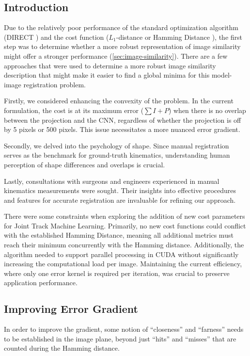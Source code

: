\subsection{Introduction}
Due to the relatively poor performance of the standard optimization algorithm (DIRECT \cite{jonesLipschitzianOptimizationLipschitz1993,floodAutomatedRegistration3D2018}) and the cost function ($L_{1}$-distance or Hamming Distance \cite{floodAutomatedRegistration3D2018}), the first step was to determine whether a more robust representation of image similarity might offer a stronger performance (\cref{sec:image-similarity}).
There are a few approaches that were used to determine a more robust image similarity description that might make it easier to find a global minima for this model-image registration problem.

Firstly, we considered enhancing the convexity of the problem.
In the current formulation, the cost is at its maximum error ($\sum I + P$) when there is no overlap between the projection and the CNN, regardless of whether the projection is off by 5 pixels or 500 pixels.
This issue necessitates a more nuanced error gradient.

Secondly, we delved into the psychology of shape.
Since manual registration serves as the benchmark for ground-truth kinematics, understanding human perception of shape differences and overlaps is crucial.

Lastly, consultations with surgeons and engineers experienced in manual kinematics measurements were sought. Their insights into effective procedures and features for accurate registration are invaluable for refining our approach.

There were some constraints when exploring the addition of new cost parameters for Joint Track Machine Learning.
Primarily, no new cost functions could conflict with the established Hamming Distance, meaning all additional metrics must reach their minimum concurrently with the Hamming distance.
Additionally, the algorithm needed to support parallel processing in CUDA without significantly increasing the computational load per image.
Maintaining the current efficiency, where only one error kernel is required per iteration, was crucial to preserve application performance.

\subsection{Improving Error Gradient}
In order to improve the gradient, some notion of ``closeness'' and ``farness'' needs to be established in the image plane, beyond just ``hits'' and ``misses'' that are counted during the Hamming distance.

